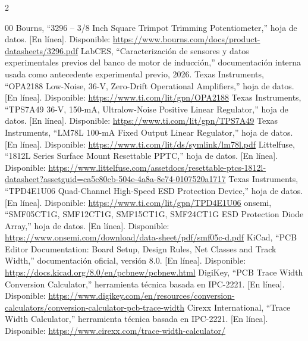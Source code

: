\documentclass[conference]{IEEEtran}
\begin{document}
\begin{multicols*}{2}
\begin{thebibliography}{00}
 Bourns, ``3296 -- 3/8 Inch Square Trimpot Trimming Potentiometer,'' hoja de datos. [En línea]. Disponible: \url{https://www.bourns.com/docs/product-datasheets/3296.pdf}
 LabCES, ``Caracterización de sensores y datos experimentales previos del banco de motor de inducción,'' documentación interna usada como antecedente experimental previo, 2026.
 Texas Instruments, ``OPA2188 Low-Noise, 36-V, Zero-Drift Operational Amplifiers,'' hoja de datos. [En línea]. Disponible: \url{https://www.ti.com/lit/gpn/OPA2188}
 Texas Instruments, ``TPS7A49 36-V, 150-mA, Ultralow-Noise Positive Linear Regulator,'' hoja de datos. [En línea]. Disponible: \url{https://www.ti.com/lit/gpn/TPS7A49}
 Texas Instruments, ``LM78L 100-mA Fixed Output Linear Regulator,'' hoja de datos. [En línea]. Disponible: \url{https://www.ti.com/lit/ds/symlink/lm78l.pdf}
 Littelfuse, ``1812L Series Surface Mount Resettable PPTC,'' hoja de datos. [En línea]. Disponible: \url{https://www.littelfuse.com/assetdocs/resettable-ptcs-1812l-datasheet?assetguid=ca5c80cb-504e-4a8a-8e74-0107520a1717}
 Texas Instruments, ``TPD4E1U06 Quad-Channel High-Speed ESD Protection Device,'' hoja de datos. [En línea]. Disponible: \url{https://www.ti.com/lit/gpn/TPD4E1U06}
 onsemi, ``SMF05CT1G, SMF12CT1G, SMF15CT1G, SMF24CT1G ESD Protection Diode Array,'' hoja de datos. [En línea]. Disponible: \url{https://www.onsemi.com/download/data-sheet/pdf/smf05c-d.pdf}
 KiCad, ``PCB Editor Documentation: Board Setup, Design Rules, Net Classes and Track Width,'' documentación oficial, versión 8.0. [En línea]. Disponible: \url{https://docs.kicad.org/8.0/en/pcbnew/pcbnew.html}
 DigiKey, ``PCB Trace Width Conversion Calculator,'' herramienta técnica basada en IPC-2221. [En línea]. Disponible: \url{https://www.digikey.com/en/resources/conversion-calculators/conversion-calculator-pcb-trace-width}
 Cirexx International, ``Trace Width Calculator,'' herramienta técnica basada en IPC-2221. [En línea]. Disponible: \url{https://www.cirexx.com/trace-width-calculator/}
\end{thebibliography}
\end{multicols*}
\end{document}
